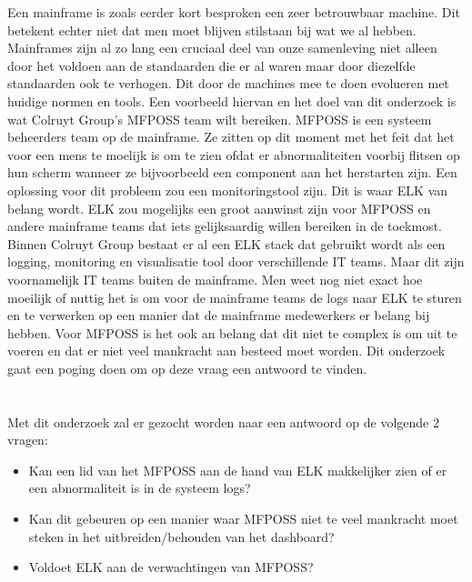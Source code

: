 Een mainframe is zoals eerder kort besproken een zeer betrouwbaar machine. Dit betekent echter niet dat men moet blijven stilstaan bij wat we al hebben. Mainframes zijn al zo lang een cruciaal deel van onze samenleving niet alleen door het voldoen aan de standaarden die er al waren maar door diezelfde standaarden ook te verhogen. Dit door de machines mee te doen evolueren met huidige normen en tools. Een voorbeeld hiervan en het doel van dit onderzoek is wat Colruyt Group's MFPOSS team wilt bereiken. MFPOSS is een systeem beheerders team op de mainframe. Ze zitten op dit moment met het feit dat het voor een mens te moelijk is om te zien ofdat er abnormaliteiten voorbij flitsen op hun scherm wanneer ze bijvoorbeeld een component aan het herstarten zijn. Een oplossing voor dit probleem zou een monitoringstool zijn. Dit is waar ELK van belang wordt. ELK zou mogelijks een groot aanwinst zijn voor MFPOSS en andere mainframe teams dat iets gelijksaardig willen bereiken in de toekmost. Binnen Colruyt Group bestaat er al een ELK stack dat gebruikt wordt als een logging, monitoring en visualisatie tool door verschillende IT teams. Maar dit zijn voornamelijk IT teams buiten de mainframe. Men weet nog niet exact hoe moeilijk of nuttig het is om voor de mainframe teams de logs naar ELK te sturen en te verwerken op een manier dat de mainframe medewerkers er belang bij hebben. Voor MFPOSS is het ook an belang dat dit niet te complex is om uit te voeren en dat er niet veel mankracht aan besteed moet worden. Dit onderzoek gaat een poging doen om op deze vraag een antwoord te vinden.

\section{}%
\label{sec:onderzoeksvraag}

Met dit onderzoek zal er gezocht worden naar een antwoord op de volgende 2 vragen:

\begin{itemize}
    \item Kan een lid van het MFPOSS aan de hand van ELK makkelijker zien of er een abnormaliteit is in de systeem logs?
    \item Kan dit gebeuren op een manier waar MFPOSS niet te veel mankracht moet steken in het uitbreiden/behouden van het dashboard?
    \item Voldoet ELK aan de verwachtingen van MFPOSS?
\end{itemize}

